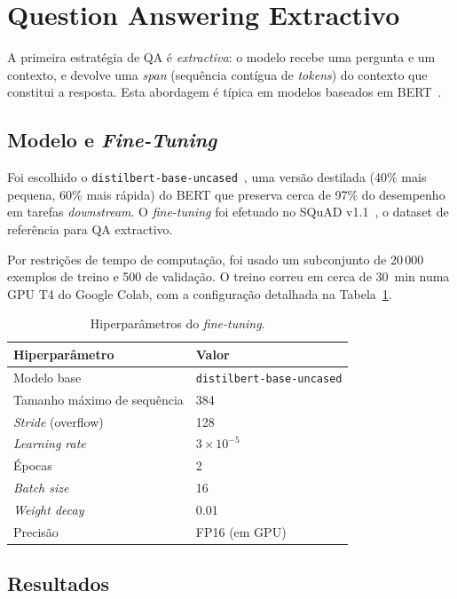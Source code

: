 \documentclass[11pt,a4paper]{article}
\begin{document}
\section{Question Answering Extractivo}

A primeira estratégia de QA é \emph{extractiva}: o modelo recebe uma pergunta e um contexto, e devolve uma \emph{span} (sequência contígua de \emph{tokens}) do contexto que constitui a resposta. Esta abordagem é típica em modelos baseados em BERT~\cite{bert}.

\subsection{Modelo e \emph{Fine-Tuning}}

Foi escolhido o \texttt{distilbert-base-uncased}~\cite{distilbert}, uma versão destilada (40\% mais pequena, 60\% mais rápida) do BERT que preserva cerca de 97\% do desempenho em tarefas \emph{downstream}. O \emph{fine-tuning} foi efetuado no SQuAD v1.1~\cite{squad}, o dataset de referência para QA extractivo.

Por restrições de tempo de computação, foi usado um subconjunto de 20\,000 exemplos de treino e 500 de validação. O treino correu em cerca de 30~min numa GPU T4 do Google Colab, com a configuração detalhada na Tabela~\ref{tab:training}.

\begin{table}[h]
\centering
\begin{tabular}{ll}
\toprule
\textbf{Hiperparâmetro} & \textbf{Valor} \\
\midrule
Modelo base & \texttt{distilbert-base-uncased} \\
Tamanho máximo de sequência & 384 \\
\emph{Stride} (overflow) & 128 \\
\emph{Learning rate} & $3 \times 10^{-5}$ \\
Épocas & 2 \\
\emph{Batch size} & 16 \\
\emph{Weight decay} & 0.01 \\
Precisão & FP16 (em GPU) \\
\bottomrule
\end{tabular}
\caption{Hiperparâmetros do \emph{fine-tuning}.}
\label{tab:training}
\end{table}

\subsection{Resultados}
\end{document}

